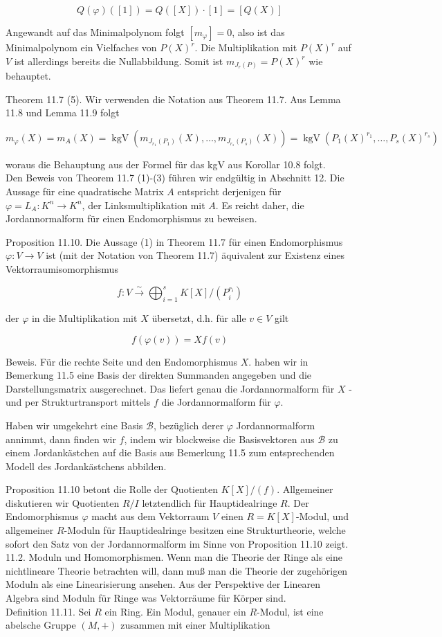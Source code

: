 \documentclass[10pt, letterpaper]{article}
\begin{document}
$$
Q(\varphi)([1])=Q([X]) \cdot[1]=[Q(X)]
$$

Angewandt auf das Minimalpolynom folgt $\left[m_{\varphi}\right]=0$, also ist das Minimalpolynom ein Vielfaches von $P(X)^{r}$. Die Multiplikation mit $P(X)^{r}$ auf $V$ ist allerdings bereits die Nullabbildung. Somit ist $m_{J_{r}(P)}=P(X)^{r}$ wie behauptet.

Theorem 11.7 (5). Wir verwenden die Notation aus Theorem 11.7. Aus Lemma 11.8 und Lemma 11.9 folgt

$$
m_{\varphi}(X)=m_{A}(X)=\operatorname{kgV}\left(m_{J_{r_{1}}\left(P_{1}\right)}(X), \ldots, m_{J_{r_{s}}\left(P_{s}\right)}(X)\right)=\operatorname{kgV}\left(P_{1}(X)^{r_{1}}, \ldots, P_{s}(X)^{r_{s}}\right)
$$

woraus die Behauptung aus der Formel für das kgV aus Korollar 10.8 folgt.\\
Den Beweis von Theorem 11.7 (1)-(3) führen wir endgültig in Abschnitt 12. Die Aussage für eine quadratische Matrix $A$ entspricht derjenigen für $\varphi=L_{A}: K^{n} \rightarrow K^{n}$, der Linksmultiplikation mit $A$. Es reicht daher, die Jordannormalform für einen Endomorphismus zu beweisen.

Proposition 11.10. Die Aussage (1) in Theorem 11.7 für einen Endomorphismus $\varphi: V \rightarrow V$ ist (mit der Notation von Theorem 11.7) äquivalent zur Existenz eines Vektorraumisomorphismus

$$
f: V \xrightarrow{\sim} \bigoplus_{i=1}^{s} K[X] /\left(P_{i}^{r_{i}}\right)
$$

der $\varphi$ in die Multiplikation mit $X$ übersetzt, d.h. für alle $v \in V$ gilt

$$
f(\varphi(v))=X f(v)
$$

Beweis. Für die rechte Seite und den Endomorphismus $X$. haben wir in Bemerkung 11.5 eine Basis der direkten Summanden angegeben und die Darstellungsmatrix ausgerechnet. Das liefert genau die Jordannormalform für $X$ - und per Strukturtransport mittels $f$ die Jordannormalform für $\varphi$.

Haben wir umgekehrt eine Basis $\mathscr{B}$, bezüglich derer $\varphi$ Jordannormalform annimmt, dann finden wir $f$, indem wir blockweise die Basisvektoren aus $\mathscr{B}$ zu einem Jordankästchen auf die Basis aus Bemerkung 11.5 zum entsprechenden Modell des Jordankästchens abbilden.

Proposition 11.10 betont die Rolle der Quotienten $K[X] /(f)$. Allgemeiner diskutieren wir Quotienten $R / I$ letztendlich für Hauptidealringe $R$. Der Endomorphismus $\varphi$ macht aus dem Vektorraum $V$ einen $R=K[X]$-Modul, und allgemeiner $R$-Moduln für Hauptidealringe besitzen eine Strukturtheorie, welche sofort den Satz von der Jordannormalform im Sinne von Proposition 11.10 zeigt.\\
11.2. Moduln und Homomorphismen. Wenn man die Theorie der Ringe als eine nichtlineare Theorie betrachten will, dann muß man die Theorie der zugehörigen Moduln als eine Linearisierung ansehen. Aus der Perspektive der Linearen Algebra sind Moduln für Ringe was Vektorräume für Körper sind.\\
Definition 11.11. Sei $R$ ein Ring. Ein Modul, genauer ein $R$-Modul, ist eine abelsche Gruppe $(M,+)$ zusammen mit einer Multiplikation
\end{document}
